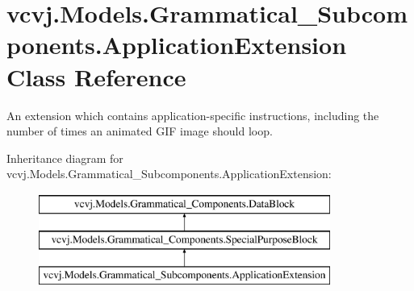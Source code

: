 \hypertarget{classvcvj_1_1_models_1_1_grammatical___subcomponents_1_1_application_extension}{}\section{vcvj.\+Models.\+Grammatical\+\_\+\+Subcomponents.\+Application\+Extension Class Reference}
\label{classvcvj_1_1_models_1_1_grammatical___subcomponents_1_1_application_extension}


An extension which contains application-\/specific instructions, including the number of times an animated G\+IF image should loop.  


Inheritance diagram for vcvj.\+Models.\+Grammatical\+\_\+\+Subcomponents.\+Application\+Extension\+:\begin{figure}[H]
\begin{center}
\leavevmode
\includegraphics[height=3.000000cm]{classvcvj_1_1_models_1_1_grammatical___subcomponents_1_1_application_extension}
\end{center}
\end{figure}

